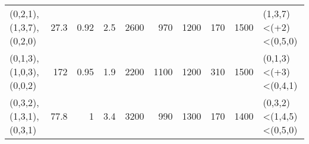 \begin{tabular}{lrrrrrrrrl}
 (0,2,1),(1,3,7),(0,2,0)     &       27.3 &                              0.92 &                            2.5  &                              2600 &                             970 &                              1200 &                             170 &       1500 & (1,3,7)<(+2)<(0,5,0)    \\
 (0,1,3),(1,0,3),(0,0,2)     &      172   &                              0.95 &                            1.9  &                              2200 &                            1100 &                              1200 &                             310 &       1500 & (0,1,3)<(+3)<(0,4,1)    \\
 (0,3,2),(1,3,1),(0,3,1)     &       77.8 &                              1    &                            3.4  &                              3200 &                             990 &                              1300 &                             170 &       1400 & (0,3,2)<(1,4,5)<(0,5,0) \\
\hline
\end{tabular}